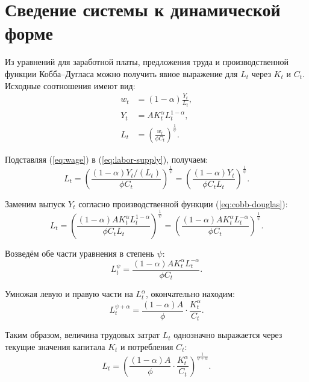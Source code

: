 \documentclass[12pt,a4paper]{report}   %
\begin{document}
        \section{Сведение системы к динамической форме}

            Из уравнений для заработной платы, предложения труда и производственной функции Кобба--Дугласа можно получить явное выражение для $L_t$ через $K_t$ и $C_t$. Исходные соотношения имеют вид:
            \begin{align}
                w_t &= (1-\alpha)\frac{Y_t}{L_t}, \label{eq:wage} \\
                Y_t &= A K_t^{\alpha} L_t^{1-\alpha}, \label{eq:cobb-douglas} \\
                L_t &= \left(\frac{w_t}{\phi C_t}\right)^{\frac{1}{\psi}}. \label{eq:labor-supply}
            \end{align}

            Подставляя (\ref{eq:wage}) в (\ref{eq:labor-supply}), получаем:
            \[
            L_t = \left( \frac{(1-\alpha)Y_t/(L_t)}{\phi C_t} \right)^{\frac{1}{\psi}}
                = \left( \frac{(1-\alpha)Y_t}{\phi C_t L_t} \right)^{\frac{1}{\psi}}.
            \]

            Заменим выпуск $Y_t$ согласно производственной функции (\ref{eq:cobb-douglas}):
            \[
            L_t = \left( \frac{(1-\alpha)A K_t^{\alpha} L_t^{1-\alpha}}{\phi C_t L_t} \right)^{\frac{1}{\psi}}
                = \left( \frac{(1-\alpha)A K_t^{\alpha} L_t^{-\alpha}}{\phi C_t} \right)^{\frac{1}{\psi}}.
            \]

            Возведём обе части уравнения в степень $\psi$:
            \[
            L_t^{\psi} = \frac{(1-\alpha)A K_t^{\alpha} L_t^{-\alpha}}{\phi C_t}.
            \]

            Умножая левую и правую части на $L_t^{\alpha}$, окончательно находим:
            \[
            L_t^{\psi+\alpha} = \frac{(1-\alpha)A}{\phi} \cdot \frac{K_t^{\alpha}}{C_t}. \label{eq: L-explicit}
            \]

            Таким образом, величина трудовых затрат $L_t$ однозначно выражается через текущие значения капитала $K_t$ и потребления $C_t$:
            \[
            L_t = \left( \frac{(1-\alpha)A}{\phi} \cdot \frac{K_t^{\alpha}}{C_t} \right)^{\frac{1}{\psi+\alpha}}.
            \]
\end{document}
